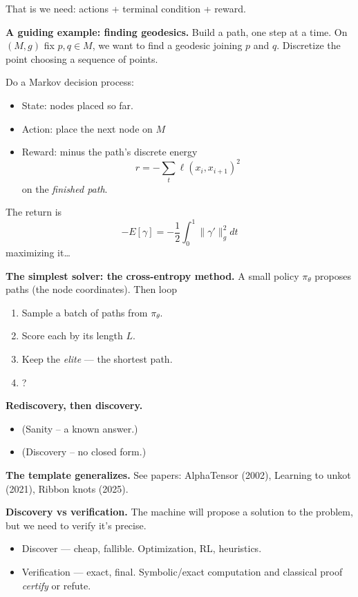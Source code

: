 That is we need: actions + terminal
condition + reward.

\medskip\noindent
{\bf A guiding example: finding geodesics.}
Build a path, one step at a time.
On $(M,g)$ fix $p,q \in M$, we want to find
a geodesic joining $p$ and $q$. Discretize
the point choosing a sequence of points.

Do a Markov decision process:
\begin{itemize}
\item State: nodes placed so far.
\item Action: place the next node on $M$
\item Reward: minus the path's discrete
energy
$$
r=-\sum_{t} \ell(x_i, x_{i+1})^2
$$
on the {\it finished path}.
\end{itemize}

\noindent
The return is
$$
-E[\gamma]=-\frac{1}{2}\int_0^1
\|\gamma'\|^2_g dt
$$
maximizing it…

\medskip\noindent
{\bf The simplest solver: the cross-entropy
method.}
A small policy $\pi_\theta$ proposes paths
(the node coordinates). Then loop
\begin{enumerate}
\item Sample a batch of paths from
$\pi_\theta$.
\item Score each by its length $L$.
\item Keep the {\it elite} --- the shortest
path.
\item  ?
\end{enumerate}

\medskip\noindent
{\bf Rediscovery, then discovery.}

\begin{itemize}
\item (Sanity -- a known answer.)

\item (Discovery -- no closed form.)
\end{itemize}

\medskip\noindent
{\bf The template generalizes.} See papers:
AlphaTensor (2002), Learning to unkot
(2021), Ribbon knots (2025).

\medskip\noindent
{\bf Discovery vs verification.}
The machine will propose a solution to the
problem, but we need to verify it's precise.

\begin{itemize}
\item Discover --- cheap, fallible.
Optimization, RL, heuristics.
\item Verification --- exact, final.
Symbolic/exact computation and classical
proof {\it certify} or refute.
\end{itemize}


